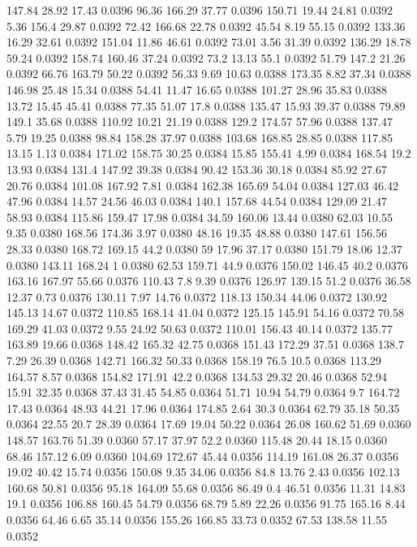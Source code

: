 147.84	28.92	17.43	0.0396
96.36	166.29	37.77	0.0396
150.71	19.44	24.81	0.0392
5.36	156.4	29.87	0.0392
72.42	166.68	22.78	0.0392
45.54	8.19	55.15	0.0392
133.36	16.29	32.61	0.0392
151.04	11.86	46.61	0.0392
73.01	3.56	31.39	0.0392
136.29	18.78	59.24	0.0392
158.74	160.46	37.24	0.0392
73.2	13.13	55.1	0.0392
51.79	147.2	21.26	0.0392
66.76	163.79	50.22	0.0392
56.33	9.69	10.63	0.0388
173.35	8.82	37.34	0.0388
146.98	25.48	15.34	0.0388
54.41	11.47	16.65	0.0388
101.27	28.96	35.83	0.0388
13.72	15.45	45.41	0.0388
77.35	51.07	17.8	0.0388
135.47	15.93	39.37	0.0388
79.89	149.1	35.68	0.0388
110.92	10.21	21.19	0.0388
129.2	174.57	57.96	0.0388
137.47	5.79	19.25	0.0388
98.84	158.28	37.97	0.0388
103.68	168.85	28.85	0.0388
117.85	13.15	1.13	0.0384
171.02	158.75	30.25	0.0384
15.85	155.41	4.99	0.0384
168.54	19.2	13.93	0.0384
131.4	147.92	39.38	0.0384
90.42	153.36	30.18	0.0384
85.92	27.67	20.76	0.0384
101.08	167.92	7.81	0.0384
162.38	165.69	54.04	0.0384
127.03	46.42	47.96	0.0384
14.57	24.56	46.03	0.0384
140.1	157.68	44.54	0.0384
129.09	21.47	58.93	0.0384
115.86	159.47	17.98	0.0384
34.59	160.06	13.44	0.0380
62.03	10.55	9.35	0.0380
168.56	174.36	3.97	0.0380
48.16	19.35	48.88	0.0380
147.61	156.56	28.33	0.0380
168.72	169.15	44.2	0.0380
59	17.96	37.17	0.0380
151.79	18.06	12.37	0.0380
143.11	168.24	1	0.0380
62.53	159.71	44.9	0.0376
150.02	146.45	40.2	0.0376
163.16	167.97	55.66	0.0376
110.43	7.8	9.39	0.0376
126.97	139.15	51.2	0.0376
36.58	12.37	0.73	0.0376
130.11	7.97	14.76	0.0372
118.13	150.34	44.06	0.0372
130.92	145.13	14.67	0.0372
110.85	168.14	41.04	0.0372
125.15	145.91	54.16	0.0372
70.58	169.29	41.03	0.0372
9.55	24.92	50.63	0.0372
110.01	156.43	40.14	0.0372
135.77	163.89	19.66	0.0368
148.42	165.32	42.75	0.0368
151.43	172.29	37.51	0.0368
138.7	7.29	26.39	0.0368
142.71	166.32	50.33	0.0368
158.19	76.5	10.5	0.0368
113.29	164.57	8.57	0.0368
154.82	171.91	42.2	0.0368
134.53	29.32	20.46	0.0368
52.94	15.91	32.35	0.0368
37.43	31.45	54.85	0.0364
51.71	10.94	54.79	0.0364
9.7	164.72	17.43	0.0364
48.93	44.21	17.96	0.0364
174.85	2.64	30.3	0.0364
62.79	35.18	50.35	0.0364
22.55	20.7	28.39	0.0364
17.69	19.04	50.22	0.0364
26.08	160.62	51.69	0.0360
148.57	163.76	51.39	0.0360
57.17	37.97	52.2	0.0360
115.48	20.44	18.15	0.0360
68.46	157.12	6.09	0.0360
104.69	172.67	45.44	0.0356
114.19	161.08	26.37	0.0356
19.02	40.42	15.74	0.0356
150.08	9.35	34.06	0.0356
84.8	13.76	2.43	0.0356
102.13	160.68	50.81	0.0356
95.18	164.09	55.68	0.0356
86.49	0.4	46.51	0.0356
11.31	14.83	19.1	0.0356
106.88	160.45	54.79	0.0356
68.79	5.89	22.26	0.0356
91.75	165.16	8.44	0.0356
64.46	6.65	35.14	0.0356
155.26	166.85	33.73	0.0352
67.53	138.58	11.55	0.0352
